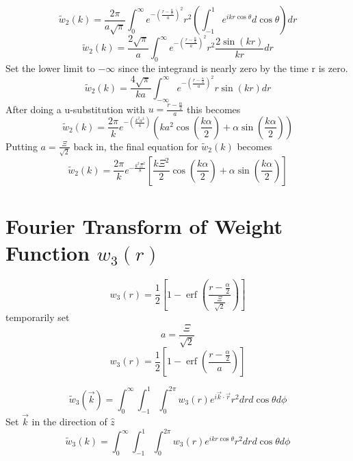 \documentclass[double,12pt]{beavtex}
\begin{document}
\begin{equation}{\widetilde{w}_2(k)=\frac{2\pi}{a\sqrt{\pi}}\int_{0}^{\infty}e^{-\left(\frac{r-\frac{\alpha}{2}}{a}\right)^2}r^2\left(\int_{-1}^{1}e^{ikr\cos\theta}d{\cos\theta}\right)d{r}}\end{equation}
\begin{equation}{\widetilde{w}_2(k)=\frac{2\sqrt{\pi}}{a}\int_{0}^{\infty}e^{-\left(\frac{r-\frac{\alpha}{2}}{a}\right)^2}r^2\frac{2\sin(kr)}{kr}d{r}}\end{equation}
Set the lower limit to $-\infty$  since the integrand is nearly zero by the time r is zero.
\begin{equation}{\widetilde{w}_2(k)=\frac{4\sqrt{\pi}}{ka}\int_{-\infty}^{\infty}e^{-\left(\frac{r-\frac{\alpha}{2}}{a}\right)^2}r\sin(kr)d{r}}\end{equation}
After doing a u-substitution with $u=\frac{r-\frac{\alpha}{2}}{a}$ this becomes
\begin{equation}{\widetilde{w}_2(k)=\frac{2\pi}{k}e^{-\left(\frac{k^2a^2}{4}\right)}\left(ka^2\cos\left(\frac{k\alpha}{2}\right)+\alpha\sin\left(\frac{k\alpha}{2}\right)\right)}\end{equation}
Putting $a=\frac{\Xi}{\sqrt{2}}$ back in, the final equation for $\widetilde{w}_2(k)$ becomes
\begin{equation}{\widetilde{w}_2(k)=\frac{2\pi}{k}e^{-\frac{k^2\Xi^2}{8}}\left[\frac{k\Xi^2}{2}\cos\left(\frac{k\alpha}{2}\right)+\alpha\sin\left(\frac{k\alpha}{2}\right)\right]}\end{equation}

\section{Fourier Transform of Weight Function $w_{3}(r)$}
\begin{equation}{w_3(r)=\frac{1}{2}\left[1-\operatorname{erf}\left(\frac{r-\frac{\alpha}{2}}{\frac{\Xi}{\sqrt{2}}}\right)\right]}\end{equation}
temporarily set 
\begin{equation}{a=\frac{\Xi}{\sqrt{2}}}\end{equation}
\begin{equation}{w_3(r)=\frac{1}{2}\left[1-\operatorname{erf}\left(\frac{r-\frac{\alpha}{2}}{a}\right)\right]}\end{equation}

\begin{equation}{\widetilde{w}_3(\vec{k})=\int_{0}^{\infty}\int_{-1}^{1}\int_{0}^{2\pi}w_3(r)e^{i\vec{k}\cdot{\vec{r}}}r^2d{r}d{\cos\theta}d{\phi}}\end{equation}
Set $\vec{k}$ in the direction of $\hat{z}$ 
\begin{equation}{\widetilde{w}_3(k)=\int_{0}^{\infty}\int_{-1}^{1}\int_{0}^{2\pi}w_3(r)e^{ikr\cos\theta}r^2d{r}d{\cos\theta}d{\phi}}\end{equation}
\end{document}
